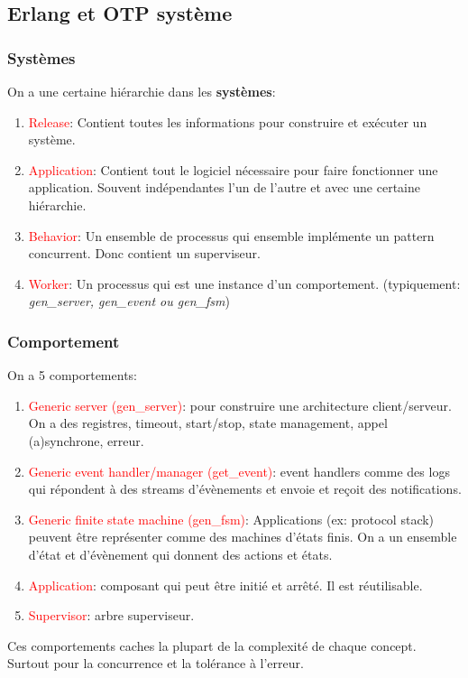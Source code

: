 \documentclass{report}
\begin{document}
\subsection{Erlang et OTP système}

\subsubsection{Systèmes}
On a une certaine hiérarchie dans les \textbf{systèmes}:
\begin{enumerate}
\item \textcolor{red}{Release}: Contient toutes les informations pour construire et exécuter un système.
\item \textcolor{red}{Application}: Contient tout le logiciel nécessaire pour faire fonctionner une application. Souvent indépendantes l'un de l'autre et avec une certaine hiérarchie.
\item \textcolor{red}{Behavior}: Un ensemble de processus qui ensemble implémente un pattern concurrent. Donc contient un superviseur.
\item \textcolor{red}{Worker}: Un processus qui est une instance d'un comportement. (typiquement: \textit{gen\_server, gen\_event ou gen\_fsm})
\end{enumerate}

\subsubsection{Comportement}
On a 5 comportements:
\begin{enumerate}
\item \textcolor{red}{Generic server (gen\_server)}: pour construire une architecture client/serveur. On a des registres, timeout, start/stop, state management, appel (a)synchrone, erreur.
\item \textcolor{red}{Generic event handler/manager (get\_event)}: event handlers comme des logs qui répondent à des streams d'évènements et envoie et reçoit des notifications.
\item \textcolor{red}{Generic finite state machine (gen\_fsm)}: Applications (ex: protocol stack) peuvent être représenter comme des machines d'états finis. On a un ensemble d'état et d'évènement qui donnent des actions et états.
\item \textcolor{red}{Application}: composant qui peut être initié et arrêté. Il est réutilisable.
\item \textcolor{red}{Supervisor}: arbre superviseur.
\end{enumerate}
Ces comportements caches la plupart de la complexité de chaque concept. Surtout pour la concurrence et la tolérance à l'erreur.
\end{document}
